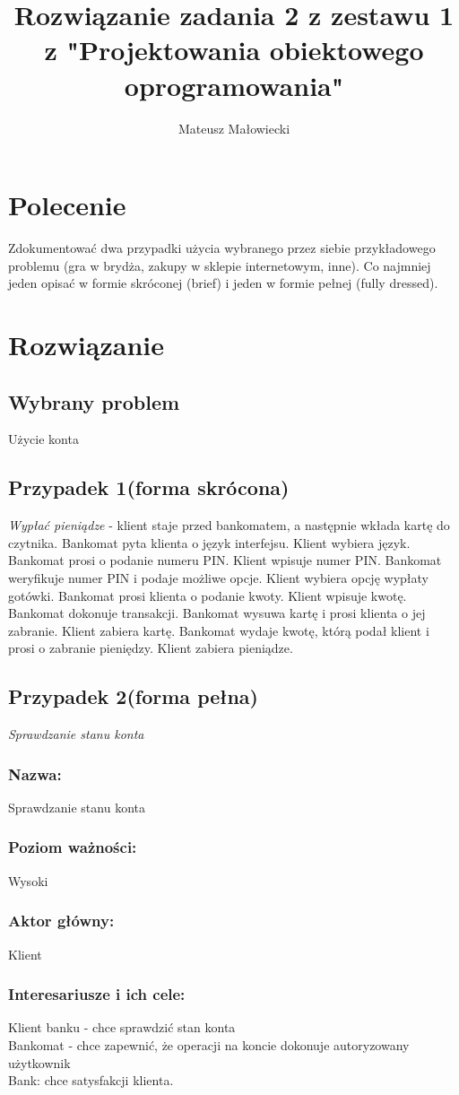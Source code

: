 \documentclass[10pt, a4paper]{article}
\title{Rozwiązanie zadania 2 z zestawu 1 z "Projektowania obiektowego oprogramowania"}
\author{Mateusz Małowiecki}
\begin{document}
\maketitle
\section*{Polecenie}
Zdokumentować dwa przypadki użycia wybranego przez siebie przykładowego problemu (gra w brydża, zakupy w sklepie internetowym, inne). Co najmniej jeden opisać w
formie skróconej (brief) i jeden w formie pełnej (fully dressed).
\section*{Rozwiązanie}
\subsection*{Wybrany problem}
Użycie konta
\subsection*{Przypadek 1(forma skrócona)}
\textit{Wypłać pieniądze} - klient staje przed bankomatem, a następnie wkłada kartę do czytnika. Bankomat pyta klienta o język interfejsu. Klient wybiera język. Bankomat prosi o podanie numeru PIN. Klient wpisuje numer PIN. Bankomat weryfikuje numer PIN i podaje możliwe opcje. Klient wybiera opcję wypłaty gotówki. Bankomat prosi klienta o podanie kwoty. Klient wpisuje kwotę. Bankomat dokonuje transakcji. Bankomat wysuwa kartę i prosi klienta o jej zabranie. Klient zabiera kartę. Bankomat wydaje kwotę, którą podał klient i prosi o zabranie pieniędzy. Klient zabiera pieniądze. 
\subsection*{Przypadek 2(forma pełna)}
\textit{Sprawdzanie stanu konta}
\subsubsection*{Nazwa:}
Sprawdzanie stanu konta
\subsubsection*{Poziom ważności:}
Wysoki
\subsubsection*{Aktor główny:} 
Klient
\subsubsection*{Interesariusze i ich cele:}
Klient banku - chce sprawdzić stan konta \\
Bankomat - chce zapewnić, że operacji na koncie dokonuje autoryzowany użytkownik \\
Bank: chce satysfakcji klienta. \\
\end{document}
